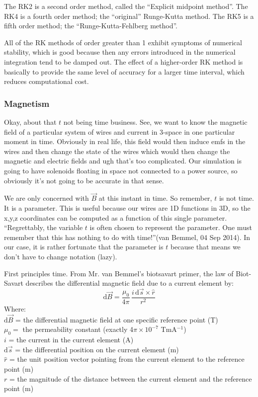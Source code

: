 \documentclass[12pt]{article}
\newcommand{\spaces}{\phantom{\qquad}}
\newcommand{\dif}{\mathrm{d}}
\begin{document}
	The RK2 is a second order method, called the ``Explicit midpoint method''.	The RK4 is a fourth order method; the ``original'' Runge-Kutta method. The RK5 is a fifth order method; the ``Runge-Kutta-Fehlberg method''.
	
	All of the RK methods of order greater than 1 exhibit symptoms of numerical stability, which is good because then any errors introduced in the numerical integration tend to be damped out. The effect of a higher-order RK method is basically to provide the same level of accuracy for a larger time interval, which reduces computational cost. 
	
	\subsubsection*{Magnetism}
	
	Okay, about that $t$ not being time business. See, we want to know the magnetic field of a particular system of wires and current in 3-space in one particular moment in time. Obviously in real life, this field would then induce emfs in the wires and then change the state of the wires which would then change the magnetic and electric fields and ugh that's too complicated. Our simulation is going to have solenoids floating in space not connected to a power source, so obviously it's not going to be accurate in that sense.
	
	We are only concerned with $\vec{B}$ at this instant in time. So remember, $t$ is not time. It is a parameter. This is useful because our wires are 1D functions in 3D, so the x,y,z coordinates can be computed as a function of this single parameter. ``Regrettably, the variable $t$ is often chosen to represent the parameter. One must remember that this has nothing to do with time!''(van Bemmel, 04 Sep 2014). In our case, it is rather fortunate that the parameter is $t$ because that means we don't have to change notation (lazy).
	
	First principles time. From Mr. van Bemmel's biotsavart primer, the law of Biot-Savart describes the differential magnetic field due to a current element by:	
			$$\dif \vec{B} = \frac{\mu_0}{4\pi} \, \frac{i\,\dif \vec{s} \times \hat{r}}{r^2}$$			
	Where: \\
		\spaces $\dif \vec{B}$ = the differential magnetic field at one specific reference point (T) \\
		\spaces $\mu_0 =$ the permeability constant (exactly 4$\pi \times 10^{-7}$ TmA$^{-1}$)\\		
		\spaces $i$ = the current in the current element (A) \\
		\spaces $\dif \vec{s}$ = the differential position on the current element (m) \\
		\spaces $\hat{r}$ = the unit position vector pointing from the current element to the reference point (m)\\
		\spaces $r$ = the magnitude of the distance between the current element and the reference point (m)
			
\end{document}
